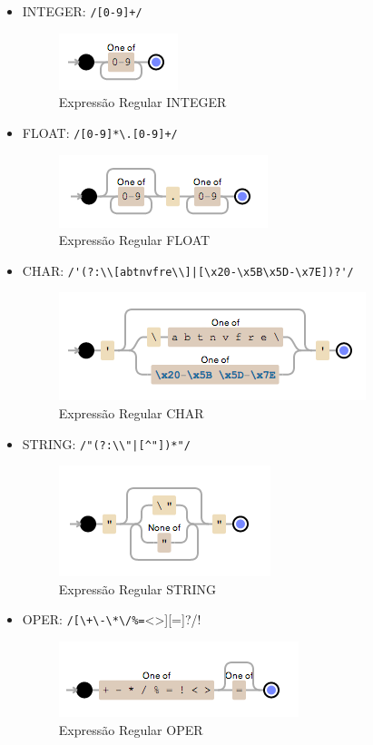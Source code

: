 \begin{itemize}
	\item INTEGER: \verb!/[0-9]+/!
	
	\begin{figure}[H]
		\centering 
		\includegraphics{images/REGEX/5-INTEGER.png}  
		\caption{Expressão Regular INTEGER}
	\end{figure}
	
	\item FLOAT: \verb!/[0-9]*\.[0-9]+/!
	
	\begin{figure}[H]
		\centering 
		\includegraphics{images/REGEX/6-FLOAT.png}  
		\caption{Expressão Regular FLOAT}
	\end{figure}
	
	\item CHAR: \verb!/'(?:\\[abtnvfre\\]|[\x20-\x5B\x5D-\x7E])?'/!
	
	\begin{figure}[H]
		\centering 
		\includegraphics{images/REGEX/7-CHAR.png}  
		\caption{Expressão Regular CHAR}
	\end{figure}
	
	\item STRING: \verb!/"(?:\\"|[^"])*"/!
	
	\begin{figure}[H]
		\centering 
		\includegraphics{images/REGEX/8-STRING.png}  
		\caption{Expressão Regular STRING}
	\end{figure}
	
	\item OPER: \verb!/[\+\-\*\/%=!<>][=]?/!
	
	\begin{figure}[H]
		\centering 
		\includegraphics{images/REGEX/9-OPER.png}  
		\caption{Expressão Regular OPER}
	\end{figure}

\end{itemize}
